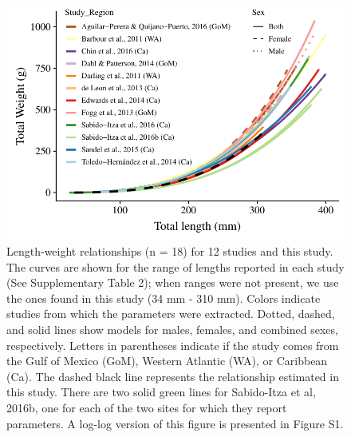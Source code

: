 \documentclass[fleqn,10pt,lineno]{wlpeerj} %
\begin{document}
\begin{figure}
\centering
\includegraphics{Manuscript_files/figure-latex/fit2-1.pdf}
\caption{\label{fig:all_allo}Length-weight relationships (n = 18) for 12
studies and this study. The curves are shown for the range of lengths
reported in each study (See Supplementary Table 2); when ranges were not
present, we use the ones found in this study (34 mm - 310 mm). Colors
indicate studies from which the parameters were extracted. Dotted,
dashed, and solid lines show models for males, females, and combined
sexes, respectively. Letters in parentheses indicate if the study comes
from the Gulf of Mexico (GoM), Western Atlantic (WA), or Caribbean (Ca).
The dashed black line represents the relationship estimated in this
study. There are two solid green lines for Sabido-Itza et al, 2016b, one
for each of the two sites for which they report parameters. A log-log
version of this figure is presented in Figure S1.}
\end{figure}
\end{document}
